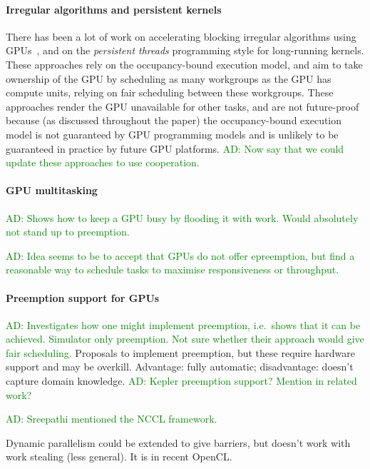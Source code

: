 \documentclass[numbers,nocopyrightspace,10pt]{sigplanconf}
\newcommand{\ADComment}[1]{\textcolor{green}{AD: #1}}
\begin{document}
\paragraph{Irregular algorithms and persistent kernels}
%
There has been a lot of work on accelerating blocking irregular
algorithms using GPUs~\cite{...}, and on the \emph{persistent threads}
programming style for long-running kernels.  These approaches rely on
the occupancy-bound execution model, and aim to take ownership of the
GPU by scheduling as many workgroups as the GPU has compute units,
relying on fair scheduling between these workgroups.  These approaches
render the GPU unavailable for other tasks, and are not future-proof
because (as discussed throughout the paper) the occupancy-bound
execution model is not guaranteed by GPU programming models and is
unlikely to be guaranteed in practice by future GPU platforms.
%
\ADComment{Now say that we could update these approaches to use cooperation.}

\paragraph{GPU multitasking}
%
\cite{DBLP:journals/tog/SteinbergerKBKDS14} \ADComment{Shows how to
  keep a GPU busy by flooding it with work.  Would absolutely not
  stand up to preemption.}

\cite{DBLP:conf/usenix/KatoLRI11} \ADComment{Idea seems to be to
  accept that GPUs do not offer epreemption, but find a reasonable way
  to schedule tasks to maximise responsiveness or throughput.}

\paragraph{Preemption support for GPUs}
%
\cite{DBLP:conf/asplos/ParkPM15} \ADComment{Investigates how one might
  implement preemption, i.e.\ shows that it can be achieved.
  Simulator only preemption.  Not sure whether their approach would
  give fair scheduling.}
%
Proposals to implement preemption, but these require hardware support and may be overkill.  Advantage: fully automatic; disadvantage: doesn't capture domain knowledge.
%
\ADComment{Kepler preemption support?  Mention in related work?}

\ADComment{Sreepathi mentioned the NCCL framework.}


Dynamic parallelism could be extended to give barriers, but doesn't work with work stealing (less general).  It is in recent OpenCL.
\end{document}
